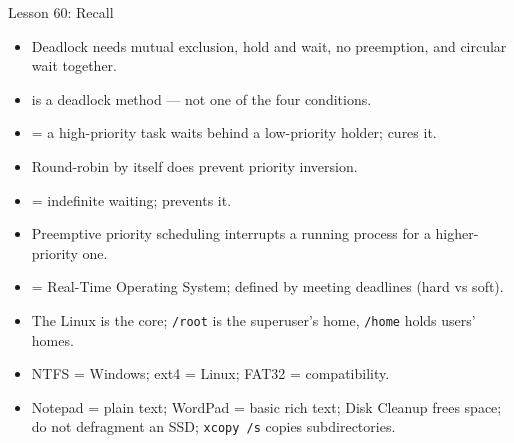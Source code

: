 \documentclass[aspectratio=169]{beamer}
\begin{document}
\begin{frame}{Lesson 60: Recall}
  \begin{itemize}
    \item Deadlock needs mutual exclusion, hold and wait, no preemption, and
      circular wait together.
    \item {} is a deadlock  method ---
      not one of the four conditions.
    \item {} = a high-priority task waits behind a
      low-priority holder;  cures it.
    \item Round-robin by itself does  prevent priority inversion.
    \item {} = indefinite waiting;  prevents it.
    \item Preemptive priority scheduling interrupts a running process for a
      higher-priority one.
    \item {} = Real-Time Operating System; defined by meeting
      deadlines (hard vs soft).
    \item The Linux  is the core; \texttt{/root} is the
      superuser's home, \texttt{/home} holds users' homes.
    \item NTFS = Windows; ext4 = Linux; FAT32 = compatibility.
    \item Notepad = plain text; WordPad = basic rich text; Disk Cleanup frees
      space; do not defragment an SSD; \texttt{xcopy /s} copies
      subdirectories.
  \end{itemize}
\end{frame}
\end{document}
